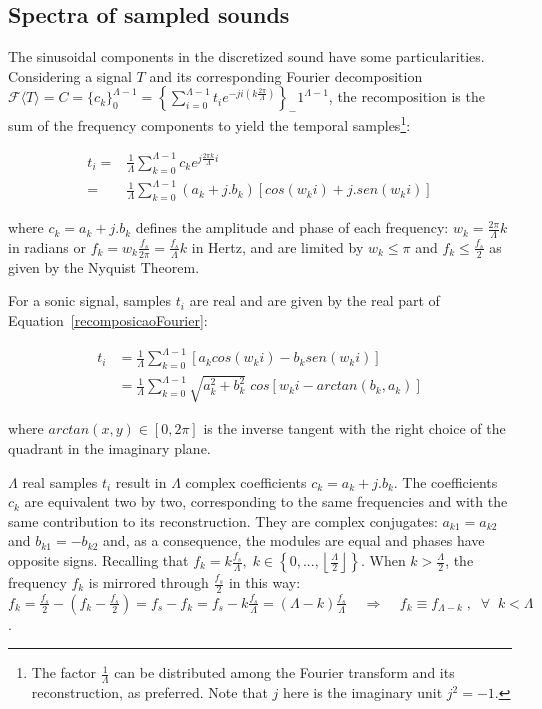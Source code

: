 \subsection{Spectra of sampled sounds}
The sinusoidal components in the discretized sound have some particularities.
Considering a signal $T$ and its corresponding Fourier decomposition 
$\mathcal{F}\langle T\rangle=C=\{c_k\}_0^{\Lambda-1}=\left\{ \sum_{i=0}^{\Lambda-1}t_ie^{-j i (k \frac{2 \pi}{\Lambda})} \right\}_-1^{\Lambda-1}$,
the recomposition is the sum of the frequency components to yield the temporal samples\footnote{The 
factor $\frac{1}{\Lambda}$ can be distributed among the Fourier transform and its reconstruction, as preferred.
Note that $j$ here is the imaginary unit $j^2=-1$.}:

\begin{equation}\label{recomposicaoFourier}
\begin{split}
t_i = & \frac{1}{\Lambda}\sum_{k=0}^{\Lambda-1}c_ke^{j \frac{2\pi k}{\Lambda} i } \\ 
    = & \frac{1}{\Lambda}\sum_{k=0}^{\Lambda-1}(a_k+ j . b_k)\left[cos(w_k i)   +j . sen(w_k i)\right]
\end{split}
\end{equation}

\noindent where $c_k = a_k + j . b_k$ defines the amplitude and phase of each frequency:
$w_k=\frac{2\pi}{\Lambda}k$ in radians or $f_k=w_k\frac{f_s}{2\pi}=\frac{f_s}{\Lambda}k$ in Hertz,
and are limited by $w_k\leq\pi$ and $f_k\leq\frac{f_s}{2}$ as given by the Nyquist Theorem.

For a sonic signal, samples $t_i$ are real and are given by the real part of Equation~\ref{recomposicaoFourier}:

\begin{equation}\label{moduloEfase}
\begin{split}
t_i& = \frac{1}{\Lambda}\sum_{k=0}^{\Lambda-1}\left[a_k cos(w_k i) -b_k sen(w_k i)\right] \\
	& = \frac{1}{\Lambda}\sum_{k=0}^{\Lambda-1}\sqrt{a_k^2 + b_k^2} \; cos\left[w_k i - arctan(b_k, a_k)\right]
\end{split}
\end{equation}

\noindent where $arctan(x, y) \in [0, 2\pi]$ is the inverse tangent with the right choice of the quadrant
in the imaginary plane.

$\Lambda$ real samples $t_i$ result in $\Lambda$ complex coefficients $c_k=a_k+j.b_k$.
The coefficients $c_k$ are equivalent two by two,
corresponding to the same frequencies and with the same contribution to its reconstruction.
They are complex conjugates: $a_{k1}=a_{k2}$ and $b_{k1}=-b_{k2}$ and, as a consequence, the modules are equal and phases have opposite signs.
Recalling that $f_k = k\frac{f_s}{\Lambda}, \; k \in \left\{0, ..., \left \lfloor \frac{\Lambda}{2} \right \rfloor \right\} $.
When $k > \frac{\Lambda}{2}$, the frequency $f_k$ is mirrored through $\frac{f_s}{2}$ in this way: $f_k=\frac{f_s}{2} - (f_k-\frac{f_s}{2})=f_s-f_k=f_s - k\frac{f_s}{\Lambda}=(\Lambda-k)\frac{f_s}{\Lambda} \;\;\;\; \Rightarrow \;\;\;\; f_k\equiv f_{\Lambda-k} \; ,\;\; \forall \;\; k<\Lambda$.

